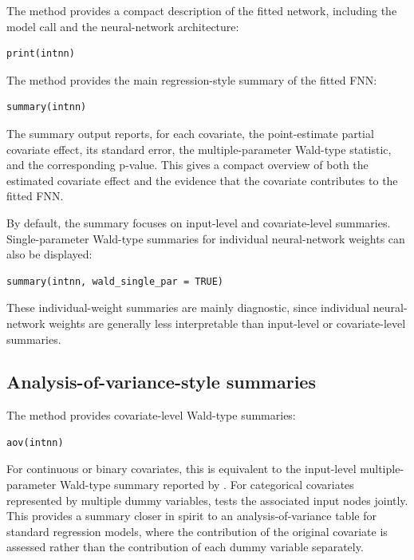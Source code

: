 The  method provides a compact description of the fitted network, including the model call and the neural-network architecture:

\begin{verbatim}
print(intnn)
\end{verbatim}

The  method provides the main regression-style summary of the fitted FNN:

\begin{verbatim}
summary(intnn)
\end{verbatim}

The summary output reports, for each covariate, the point-estimate partial covariate effect, its standard error, the multiple-parameter Wald-type statistic, and the corresponding p-value.
This gives a compact overview of both the estimated covariate effect and the evidence that the covariate contributes to the fitted FNN.

By default, the summary focuses on input-level and covariate-level summaries.
Single-parameter Wald-type summaries for individual neural-network weights can also be displayed:

\begin{verbatim}
summary(intnn, wald_single_par = TRUE)
\end{verbatim}

These individual-weight summaries are mainly diagnostic, since individual neural-network weights are generally less interpretable than input-level or covariate-level summaries.

\subsection{Analysis-of-variance-style summaries}\label{analysis-of-variance-style-summaries}

The  method provides covariate-level Wald-type summaries:

\begin{verbatim}
aov(intnn)
\end{verbatim}

For continuous or binary covariates, this is equivalent to the input-level multiple-parameter Wald-type summary reported by .
For categorical covariates represented by multiple dummy variables,  tests the associated input nodes jointly.
This provides a summary closer in spirit to an analysis-of-variance table for standard regression models, where the contribution of the original covariate is assessed rather than the contribution of each dummy variable separately.

